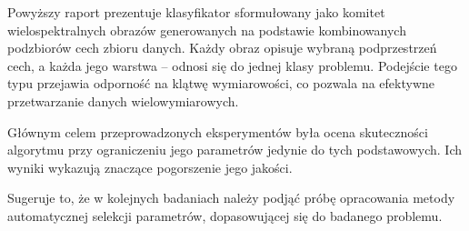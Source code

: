 
Powyższy raport prezentuje klasyfikator sformułowany jako komitet wielospektralnych obrazów generowanych na podstawie kombinowanych podzbiorów cech zbioru danych. Każdy obraz opisuje wybraną podprzestrzeń cech, a każda jego warstwa -- odnosi się do jednej klasy problemu. Podejście tego typu przejawia odporność na klątwę wymiarowości, co pozwala na efektywne przetwarzanie danych wielowymiarowych.

Głównym celem przeprowadzonych eksperymentów była ocena skuteczności algorytmu przy ograniczeniu jego parametrów jedynie do tych podstawowych. Ich wyniki wykazują znaczące pogorszenie jego jakości.

Sugeruje to, że w kolejnych badaniach należy podjąć próbę opracowania metody automatycznej selekcji parametrów, dopasowującej się do badanego problemu. 